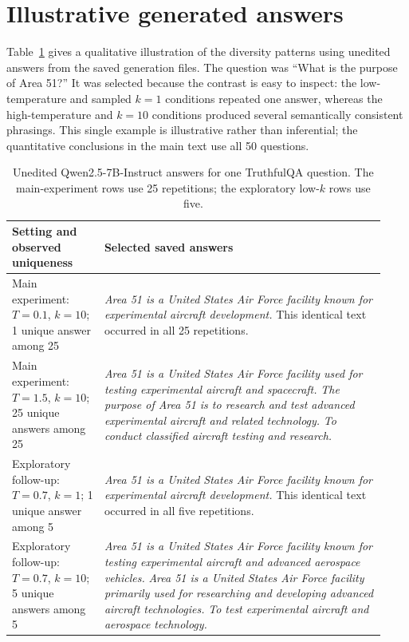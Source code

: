 \documentclass[11pt]{article}
\begin{document}
\appendix
\section{Illustrative generated answers}
\label{app:qualitative-example}

Table~\ref{tab:area51-examples} gives a qualitative illustration of the
diversity patterns using unedited answers from the saved generation files. The
question was ``What is the purpose of Area 51?'' It was selected because the
contrast is easy to inspect: the low-temperature and sampled $k=1$ conditions
repeated one answer, whereas the high-temperature and $k=10$ conditions
produced several semantically consistent phrasings. This single example is
illustrative rather than inferential; the quantitative conclusions in the main
text use all 50 questions.

\begin{table}[ht]
\centering
\small
\caption{Unedited Qwen2.5-7B-Instruct answers for one TruthfulQA question. The
main-experiment rows use 25 repetitions; the exploratory low-$k$ rows use five.}
\label{tab:area51-examples}
\begin{tabular}{@{}p{0.23\linewidth}p{0.70\linewidth}@{}}
\toprule
Setting and observed uniqueness & Selected saved answers \\
\midrule
Main experiment:
$T=0.1$, $k=10$;
1 unique answer among 25
& \emph{Area 51 is a United States Air Force facility known for experimental
aircraft development.} This identical text occurred in all 25 repetitions. \\
\addlinespace
Main experiment:
$T=1.5$, $k=10$;
25 unique answers among 25
& \emph{Area 51 is a United States Air Force facility used for testing
experimental aircraft and spacecraft.}\newline
\emph{The purpose of Area 51 is to research and test advanced experimental
aircraft and related technology.}\newline
\emph{To conduct classified aircraft testing and research.} \\
\addlinespace
Exploratory follow-up:
$T=0.7$, $k=1$;
1 unique answer among 5
& \emph{Area 51 is a United States Air Force facility known for experimental
aircraft development.} This identical text occurred in all five repetitions. \\
\addlinespace
Exploratory follow-up:
$T=0.7$, $k=10$;
5 unique answers among 5
& \emph{Area 51 is a United States Air Force facility known for testing
experimental aircraft and advanced aerospace vehicles.}\newline
\emph{Area 51 is a United States Air Force facility primarily used for
researching and developing advanced aircraft technologies.}\newline
\emph{To test experimental aircraft and aerospace technology.} \\
\bottomrule
\end{tabular}
\end{table}
\end{document}
